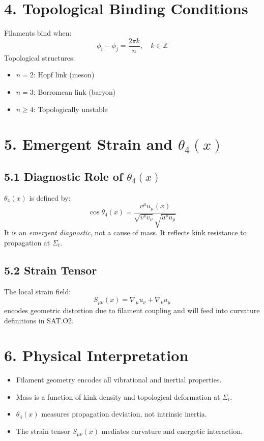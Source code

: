 \documentclass[12pt]{article}
\begin{document}
\section*{4. Topological Binding Conditions}

Filaments bind when:
\[
\phi_i - \phi_j = \frac{2\pi k}{n}, \quad k \in \mathbb{Z}
\]
Topological structures:
\begin{itemize}
    \item \( n=2 \): Hopf link (meson)
    \item \( n=3 \): Borromean link (baryon)
    \item \( n \geq 4 \): Topologically unstable
\end{itemize}

\section*{5. Emergent Strain and \(\theta_4(x)\)}

\subsection*{5.1 Diagnostic Role of \(\theta_4(x)\)}

\(\theta_4(x)\) is defined by:
\[
\cos \theta_4(x) = \frac{v^\mu u_\mu(x)}{\sqrt{v^\nu v_\nu} \sqrt{u^\rho u_\rho}}
\]
It is an \emph{emergent diagnostic}, not a cause of mass. It reflects kink resistance to propagation at \( \Sigma_t \).

\subsection*{5.2 Strain Tensor}

The local strain field:
\[
S_{\mu\nu}(x) = \nabla_\mu u_\nu + \nabla_\nu u_\mu
\]
encodes geometric distortion due to filament coupling and will feed into curvature definitions in SAT.O2.

\section*{6. Physical Interpretation}

\begin{itemize}
    \item Filament geometry encodes all vibrational and inertial properties.
    \item Mass is a function of kink density and topological deformation at \( \Sigma_t \).
    \item \( \theta_4(x) \) measures propagation deviation, not intrinsic inertia.
    \item The strain tensor \( S_{\mu\nu}(x) \) mediates curvature and energetic interaction.
\end{itemize}
\end{document}
